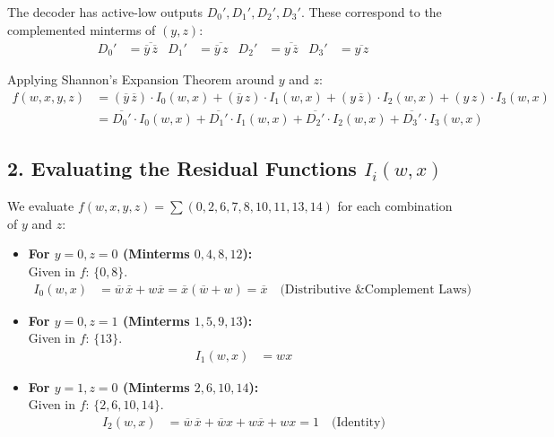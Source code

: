 \documentclass[12pt,a3paper]{article}
\begin{document}
\begin{enumerate}
\begin{tcolorbox}[enhanced,breakable,ansbox,colback=cD!4,colframe=cD,boxrule=0.8pt,arc=5pt,title={\textbf{Answer}},fonttitle=\bfseries\color{white},colbacktitle=cD]
The decoder has active-low outputs $D_0', D_1', D_2', D_3'$. These correspond to the complemented minterms of $(y,z)$:
\begin{align*}
    D_0' &= \overline{\overline{y}\,\overline{z}} & D_1' &= \overline{\overline{y}\,z} & D_2' &= \overline{y\,\overline{z}} & D_3' &= \overline{y\,z}
\end{align*}

Applying Shannon's Expansion Theorem around $y$ and $z$:
\begin{align*}
    f(w, x, y, z) &= (\overline{y}\,\overline{z}) \cdot I_0(w, x) + (\overline{y}\,z) \cdot I_1(w, x) + (y\,\overline{z}) \cdot I_2(w, x) + (y\,z) \cdot I_3(w, x) \\
    &= \overline{D_0'} \cdot I_0(w, x) + \overline{D_1'} \cdot I_1(w, x) + \overline{D_2'} \cdot I_2(w, x) + \overline{D_3'} \cdot I_3(w, x)
\end{align*}

\subsection*{2. Evaluating the Residual Functions $I_i(w, x)$}
We evaluate $f(w, x, y, z) = \sum(0, 2, 6, 7, 8, 10, 11, 13, 14)$ for each combination of $y$ and $z$:

\begin{itemize}
    \item \textbf{For $y=0, z=0$ (Minterms $0, 4, 8, 12$):}\\
    Given in $f$: $\{0, 8\}$.
    \begin{align*}
        I_0(w, x) &= \overline{w}\,\overline{x} + w\overline{x} = \overline{x}(\overline{w} + w) = \overline{x} \quad \text{(Distributive \& Complement Laws)}
    \end{align*}
    
    \item \textbf{For $y=0, z=1$ (Minterms $1, 5, 9, 13$):}\\
    Given in $f$: $\{13\}$.
    \begin{align*}
        I_1(w, x) &= wx
    \end{align*}
    
    \item \textbf{For $y=1, z=0$ (Minterms $2, 6, 10, 14$):}\\
    Given in $f$: $\{2, 6, 10, 14\}$.
    \begin{align*}
        I_2(w, x) &= \overline{w}\,\overline{x} + \overline{w}x + w\overline{x} + wx = 1 \quad \text{(Identity)}
    \end{align*}
    

\end{itemize}
\end{tcolorbox}
\end{enumerate}
\end{document}
